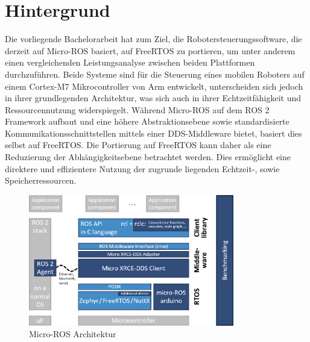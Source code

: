 \section{Hintergrund}

Die vorliegende Bachelorarbeit hat zum Ziel, die Robotersteuerungssoftware, die
derzeit auf Micro-ROS basiert, auf FreeRTOS zu portieren, um unter anderem einen
vergleichenden Leistungsanalyse zwischen beiden Plattformen durchzuführen. Beide
Systeme sind für die Steuerung eines mobilen Roboters auf einem Cortex-M7
Mikrocontroller von Arm entwickelt, unterscheiden sich jedoch in ihrer
grundlegenden Architektur, was sich auch in ihrer Echtzeitfähigkeit und
Ressourcennutzung widerspiegelt. Während Micro-ROS auf dem \ac{ROS 2} Framework
aufbaut und eine höhere Abstraktionsebene sowie standardisierte
Kommunikationsschnittstellen mittels einer \ac{DDS}-Middleware bietet, basiert
dies selbst auf FreeRTOS. Die Portierung auf FreeRTOS kann daher als eine
Reduzierung der Abhängigkeitsebene betrachtet werden. Dies ermöglicht eine
direktere und effizientere Nutzung der zugrunde liegenden Echtzeit-, sowie
Speicherressourcen.

\begin{figure}[htb] \centering
    \includegraphics[width=0.8\textwidth]{assets/Micro-ROS_architecture}
    \caption{Micro-ROS Architektur\cite[S. 6]{koubaa2023}}
\end{figure}


